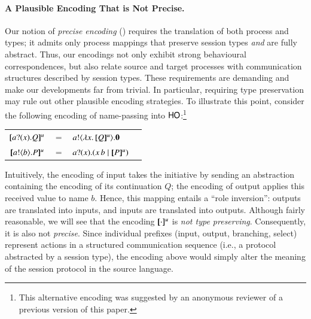 \documentclass[runningheads]{llncs}
\begin{document}
\paragraph{A Plausible Encoding That is Not Precise.}
Our notion of \emph{precise encoding} () 
requires the translation of both process and types; it  
admits only process mappings that preserve session types
\emph{and} are fully abstract. Thus, our encodings 
not only exhibit  strong behavioural correspondences, but also 
 relate source and target processes with  
communication structures described by session types.
These requirements are demanding and make our developments far from trivial.
In particular, requiring type preservation may rule out other plausible encoding strategies.
To illustrate this point,
consider the  following encoding of %
name-passing 
into $\mathsf{HO}$:\footnote{This alternative  encoding was suggested by an anonymous reviewer of a previous version of this paper.} %
\begin{center}
\begin{tabular}{rcll}
  $[\!\![a ? (x) . Q]\!\!]^u$	&$=$&	$a ! \langle \lambda x.\,[\!\![Q]\!\!]^u \rangle . \mathbf{0}$ \\
    $[\!\![a ! \langle b \rangle . P]\!\!]^u$	&$=$&	$a ? (x) .( x\, {b} \;|\; [\!\![P]\!\!]^u)$ 
\end{tabular}
\end{center}
{Intuitively, 
the encoding of input takes the initiative by sending an abstraction containing the encoding of its continuation $Q$;
the encoding of output applies this received value to name $b$.}
Hence, this mapping entails  a 
``role inversion'': outputs are translated into inputs, and inputs are translated into outputs. 
Although fairly reasonable, we will see that the encoding $[\!\![\cdot]\!\!]^u$  
is \emph{not type preserving}. Consequently, it is also not \emph{precise}.
Since individual prefixes (input, output, branching, select) 
represent actions in a structured communication sequence (i.e., a protocol abstracted by a session type),
the encoding above would simply alter the meaning of the session protocol in the source language.

\end{document}
